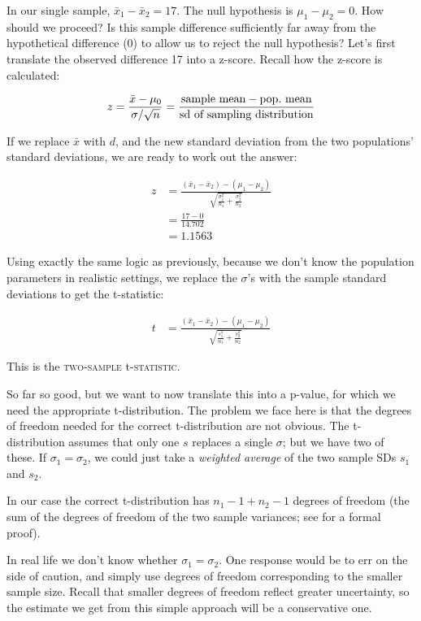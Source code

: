 \documentclass[12pt]{book}\usepackage[]{graphicx}\usepackage[]{color}
\begin{document}
In our single sample, $\bar{x}_1 - \bar{x}_2 = 17$.
The null hypothesis is $\mu_1 - \mu_2 = 0$.
How should we proceed? Is this sample difference sufficiently far away from the hypothetical difference (0) to allow us to reject the null hypothesis? Let's first translate the observed difference 17 into a z-score. Recall how the z-score is calculated:

\begin{equation}
z = \frac{\bar{x} - \mu_0}{\sigma/\sqrt{n}} = \frac{\hbox{sample mean} - \hbox{pop.\ mean}}{\hbox{sd of sampling distribution}}
\end{equation}

If we replace $\bar{x}$ with $d$, and the new standard deviation from the two populations' standard deviations,
we are ready to work out the answer:

\begin{align}
z & = \frac{(\bar{x}_1 - \bar{x}_2) - (\mu_1- \mu_2)}{
\sqrt{\frac{\sigma_1^2}{n_1} + \frac{\sigma_2^2}{n_2}}} \\
  & = \frac{17 - 0}{14.702} \\
  & = 1.1563
\end{align}

Using exactly the same logic as previously, because we don't know the
population parameters in realistic settings, we replace the $\sigma$'s with the sample standard deviations to get the t-statistic:

\begin{align}
t & = \frac{(\bar{x}_1 - \bar{x}_2) - (\mu_1- \mu_2)}{
\sqrt{\frac{s_1^2}{n_1} + \frac{s_2^2}{n_2}}} 
\end{align}

This is the \textsc{two-sample} t-\textsc{statistic}. 

So far so good, but we want to now translate this into a p-value, for which we need
the appropriate t-distribution. The problem we face here is that
the degrees of freedom needed for the correct t-distribution are not obvious.
The t-distribution assumes that only one $s$ replaces a single $\sigma$; but
we have two of these.
If $\sigma_1 =\sigma_2$, we could just take a \textit{weighted
    average} of the two sample SDs $s_1$ and $s_2$.

  In our case the correct t-distribution
has $n_1 - 1 + n_2 - 1$ degrees of freedom (the sum of the degrees of freedom
of the two sample variances; see
\cite[422]{rice1995mathematical} for a formal
proof).

In real life we don't know whether $\sigma_1 =\sigma_2$.  One
response would be to err on the side of caution, and simply use
degrees of freedom corresponding to the smaller sample size. Recall
that smaller degrees of freedom reflect greater uncertainty, so the
estimate we get from this simple approach will be a conservative one.
\end{document}
